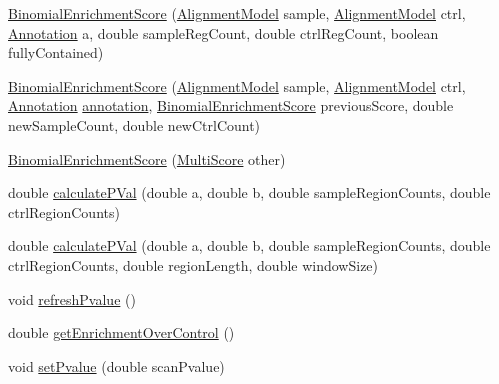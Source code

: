\begin{DoxyCompactItemize}
\item 
\hyperlink{classumms_1_1core_1_1model_1_1score_1_1_binomial_enrichment_score_aa9640ec5002b7f5b7690017d6080b703}{Binomial\+Enrichment\+Score} (\hyperlink{classumms_1_1core_1_1model_1_1_alignment_model}{Alignment\+Model} sample, \hyperlink{classumms_1_1core_1_1model_1_1_alignment_model}{Alignment\+Model} ctrl, \hyperlink{interfaceumms_1_1core_1_1annotation_1_1_annotation}{Annotation} a, double sample\+Reg\+Count, double ctrl\+Reg\+Count, boolean fully\+Contained)
\item 
\hyperlink{classumms_1_1core_1_1model_1_1score_1_1_binomial_enrichment_score_aef9d4cc7dda07eaaf9f30275671506a7}{Binomial\+Enrichment\+Score} (\hyperlink{classumms_1_1core_1_1model_1_1_alignment_model}{Alignment\+Model} sample, \hyperlink{classumms_1_1core_1_1model_1_1_alignment_model}{Alignment\+Model} ctrl, \hyperlink{interfaceumms_1_1core_1_1annotation_1_1_annotation}{Annotation} \hyperlink{classumms_1_1core_1_1model_1_1score_1_1_window_score_1_1_abstract_window_score_a455fb02f18f492e611113b9da0a24888}{annotation}, \hyperlink{classumms_1_1core_1_1model_1_1score_1_1_binomial_enrichment_score}{Binomial\+Enrichment\+Score} previous\+Score, double new\+Sample\+Count, double new\+Ctrl\+Count)
\item 
\hyperlink{classumms_1_1core_1_1model_1_1score_1_1_binomial_enrichment_score_abb10ce56c91325d65c9de3179c5d896c}{Binomial\+Enrichment\+Score} (\hyperlink{classumms_1_1core_1_1model_1_1score_1_1_multi_score}{Multi\+Score} other)
\item 
double \hyperlink{classumms_1_1core_1_1model_1_1score_1_1_binomial_enrichment_score_a9ce874d7fa579be05ecc406e0bd104da}{calculate\+P\+Val} (double a, double b, double sample\+Region\+Counts, double ctrl\+Region\+Counts)
\item 
double \hyperlink{classumms_1_1core_1_1model_1_1score_1_1_binomial_enrichment_score_a0c25ea645b717cb72c98ba343b39d2a0}{calculate\+P\+Val} (double a, double b, double sample\+Region\+Counts, double ctrl\+Region\+Counts, double region\+Length, double window\+Size)
\item 
void \hyperlink{classumms_1_1core_1_1model_1_1score_1_1_binomial_enrichment_score_a49fde369c9dbe748e444cbf2d27412ac}{refresh\+Pvalue} ()
\item 
double \hyperlink{classumms_1_1core_1_1model_1_1score_1_1_binomial_enrichment_score_abe55eff1931234a966a48da40987b2a5}{get\+Enrichment\+Over\+Control} ()
\item 
void \hyperlink{classumms_1_1core_1_1model_1_1score_1_1_binomial_enrichment_score_ae549727787065b81209f827f7b246808}{set\+Pvalue} (double scan\+Pvalue)

\end{DoxyCompactItemize}
